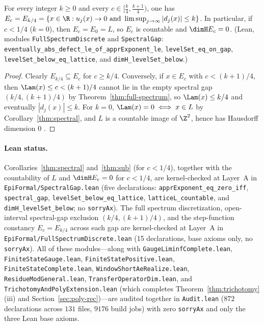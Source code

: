 \begin{corollary}\label{thm:sub}
For every integer $k\ge0$ and every $c\in\bigl[\frac{k}{4},\frac{k+1}{4}\bigr)$,
one has $E_c=E_{k/4}=\{x\in\R:u_j(x)\to0\text{ and }\limsup_{j\to\infty}|d_j(x)|\le k\}$.
In particular, if $c<1/4$ ($k=0$), then $E_c=E_0=L$, so $E_c$ is countable and
$\dimH E_c=0$.
(Lean, modules \texttt{FullSpectrumDiscrete} and \texttt{SpectralGap}:
\texttt{eventually\_\allowbreak abs\_\allowbreak defect\_\allowbreak le\_\allowbreak of\_\allowbreak apprExponent\_\allowbreak le},
\texttt{levelSet\_\allowbreak eq\_\allowbreak on\_\allowbreak gap},
\texttt{levelSet\_\allowbreak below\_\allowbreak eq\_\allowbreak lattice}, and
\texttt{dimH\_\allowbreak levelSet\_\allowbreak below}.)
\end{corollary}

\begin{proof}
Clearly $E_{k/4}\subseteq E_c$ for $c\ge k/4$. Conversely, if $x\in E_c$ with
$c<(k+1)/4$, then $\Lam(x)\le c<(k+1)/4$ cannot lie in the empty spectral gap
$(k/4,(k+1)/4)$ by Theorem~\ref{thm:full-spectrum}, so $\Lam(x)\le k/4$ and
eventually $|d_j(x)|\le k$. For $k=0$, $\Lam(x)=0\iff x\in L$ by
Corollary~\ref{thm:spectral}, and $L$ is a countable image of $\Z^2$, hence has
Hausdorff dimension $0$ \cite{Falconer}.
\end{proof}

\paragraph{Lean status.} Corollaries~\ref{thm:spectral} and~\ref{thm:sub} (for
$c<1/4$), together with the countability of $L$ and $\dimH E_c=0$ for $c<1/4$,
are kernel-checked at Layer~A in \texttt{EpiFormal/\allowbreak SpectralGap.lean}
(five declarations: \texttt{apprExponent\_eq\_zero\_iff},
\texttt{spectral\_gap}, \texttt{levelSet\_below\_eq\_lattice},
\texttt{latticeL\_countable}, and \texttt{dimH\_levelSet\_below}; no
\texttt{sorryAx}). The full spectrum discretization, open-interval spectral-gap
exclusion $(k/4,(k+1)/4)$, and the step-function constancy $E_c=E_{k/4}$ across
each gap are kernel-checked at Layer~A in
\texttt{EpiFormal/\allowbreak FullSpectrumDiscrete.lean} (15 declarations, base
axioms only, no \texttt{sorryAx}). All of these modules---along with
\texttt{Gauge\allowbreak Liminf\allowbreak Complete.lean},
\texttt{Finite\allowbreak State\allowbreak Gauge.lean},
\texttt{Finite\allowbreak State\allowbreak Positive.lean},
\texttt{Finite\allowbreak State\allowbreak Complete.lean},
\texttt{Window\allowbreak Short\allowbreak AeRealize.lean},
\texttt{Residue\allowbreak ModGeneral.lean},
\texttt{Transfer\allowbreak Operator\allowbreak Dim.lean}, and
\texttt{Trichotomy\allowbreak And\allowbreak Poly\allowbreak Extension.lean}
(which completes Theorem~\ref{thm:trichotomy}(iii) and Section~\ref{sec:poly-rec})---are
audited together in \texttt{Audit.lean} ($872$ declarations across $131$ files,
$9176$ build jobs) with zero \texttt{sorryAx} and only the three Lean base axioms.

